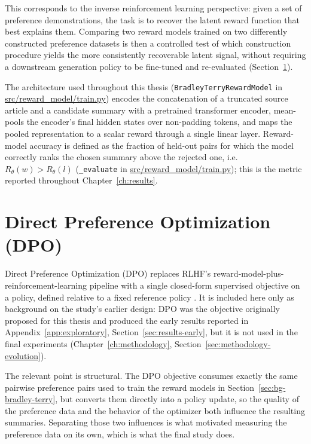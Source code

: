 This corresponds to the inverse reinforcement learning perspective: given a set
of preference demonstrations, the task is to recover the latent reward function
that best explains them. Comparing two reward models trained on two differently
constructed preference datasets is then a controlled test of which construction
procedure yields the more consistently recoverable latent signal, without
requiring a downstream generation policy to be fine-tuned and re-evaluated
(Section~\ref{sec:bg-dpo}).

The architecture used throughout this thesis (\texttt{BradleyTerryRewardModel} in
\url{src/reward_model/train.py}) encodes the concatenation of a truncated source
article and a candidate summary with a pretrained transformer encoder, mean-pools
the encoder's final hidden states over non-padding tokens, and maps the pooled
representation to a scalar reward through a single linear layer. Reward-model
accuracy is defined as the fraction of held-out pairs for which the model correctly
ranks the chosen summary above the rejected one, i.e.\ $R_\theta(w) > R_\theta(l)$
(\texttt{\_evaluate} in \url{src/reward_model/train.py}); this is the metric
reported throughout Chapter~\ref{ch:results}.

\section{Direct Preference Optimization (DPO)}
\label{sec:bg-dpo}

Direct Preference Optimization (DPO) replaces RLHF's reward-model-plus-reinforcement-learning
pipeline with a single closed-form supervised objective on a policy, defined
relative to a fixed reference policy \citep{rafailov2023dpo}. It is included
here only as background on the study's earlier design: DPO was the objective
originally proposed for this thesis and produced the early results reported in
Appendix~\ref{app:exploratory}, Section~\ref{sec:results-early}, but it is not
used in the final experiments (Chapter~\ref{ch:methodology},
Section~\ref{sec:methodology-evolution}).

The relevant point is structural. The DPO objective consumes exactly the same
pairwise preference pairs used to train the reward models in
Section~\ref{sec:bg-bradley-terry}, but converts them directly into a policy
update, so the quality of the preference data and the behavior of the optimizer
both influence the resulting summaries. Separating those two influences is what
motivated measuring the preference data on its own, which is what the final
study does.

